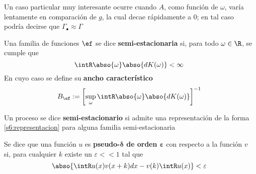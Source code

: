 
Un caso particular muy interesante ocurre cuando $A$, como función de $\omega$, varía lentamente en comparación de $g$, la cual decae rápidamente a 0; en tal caso podría decirse que $\Gamma_\bullet \approx \Gamma$


\begin{definicion}
Una familia de funciones $\ef$ se dice \textbf{semi-estacionaria} si, para todo $\omega \in \R$, se cumple que
\begin{equation}
\intR \abso{\omega} \abso{dK(\omega)} < \infty
\end{equation}
En cuyo caso se define su \textbf{ancho característico}
\begin{equation}
B_\ef := \left[ \sup_\omega \intR \abso{\omega} \abso{dK(\omega)} \right]^{-1}
\end{equation}
\end{definicion}

\begin{definicion}
Un proceso \xt se dice \textbf{semi-estacionario} si admite una representación de la forma \ref{s6:representacion} para alguna familia semi-estacionaria
\end{definicion}


\begin{definicion}
Se dice que una función $u$ es 
\textbf{pseudo-$\boldsymbol{\delta}$ de orden $\boldsymbol{\varepsilon}$} con respecto a la función $v$ si, para cualquier $k$ existe un $\varepsilon << 1$ tal que 
\begin{equation}
\abso{\intR u(x) v(x+k) dx  -  v(k)\intR u(x)} < \varepsilon
\end{equation}
\end{definicion}


